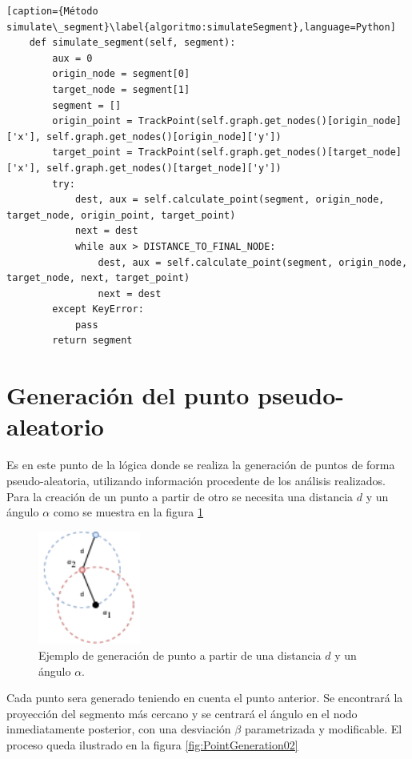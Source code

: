 \begin{lstlisting}[caption={Método simulate\_segment}\label{algoritmo:simulateSegment},language=Python] 
    def simulate_segment(self, segment):
        aux = 0
        origin_node = segment[0]
        target_node = segment[1]
        segment = []
        origin_point = TrackPoint(self.graph.get_nodes()[origin_node]['x'], self.graph.get_nodes()[origin_node]['y'])
        target_point = TrackPoint(self.graph.get_nodes()[target_node]['x'], self.graph.get_nodes()[target_node]['y'])
        try:
            dest, aux = self.calculate_point(segment, origin_node, target_node, origin_point, target_point)
            next = dest
            while aux > DISTANCE_TO_FINAL_NODE:
                dest, aux = self.calculate_point(segment, origin_node, target_node, next, target_point)
                next = dest
        except KeyError:
            pass
        return segment
\end{lstlisting}

\newpage
\section{Generación del punto pseudo-aleatorio}

Es en este punto de la lógica donde se realiza la generación de puntos de forma pseudo-aleatoria, 
utilizando información procedente de los análisis realizados.
Para la creación de un punto a partir de otro se necesita una distancia $d$ y un ángulo $\alpha$ como 
se muestra en la figura \ref{fig:PointGeneration01}
\begin{figure}[htb]
\begin{center}
\includegraphics[scale=0.75, width=0.3\textwidth]{./Imagenes/PointGeneration01.png}
\caption{Ejemplo de generación de punto a partir de una distancia $d$ y un ángulo $\alpha$.}
\label{fig:PointGeneration01}
\end{center}
\end{figure}

Cada punto sera generado teniendo en cuenta el punto anterior. Se encontrará la proyección del segmento
más cercano y se centrará el ángulo en el nodo inmediatamente posterior, con una desviación $\beta$ 
parametrizada y modificable. El proceso queda ilustrado en la figura \ref{fig:PointGeneration02}

